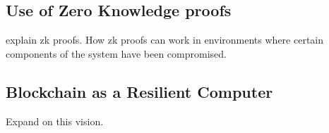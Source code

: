 \subsection{Use of Zero Knowledge proofs}

explain zk proofs. How zk proofs can work in environments where certain components
of the system have been compromised.

\subsection{Blockchain as a Resilient Computer}

Expand on this vision.

\subsection{}

